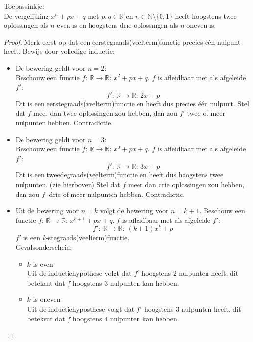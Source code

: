 \documentclass[main.tex]{subfiles}
\begin{document}
\begin{st}
  Toepassinkje:\\
  De vergelijking $x^{n} +px + q$ met $p,q \in \mathbb{R}$ en $n\in \mathbb{N} \setminus \{0,1\}$ heeft hoogstens twee oplossingen als $n$ even is en hoogstens drie oplossingen als $n$ oneven is.

  \begin{proof}
    Merk eerst op dat een eerstegraads(veelterm)functie precies \'e\'en nulpunt heeft.
    Bewijs door volledige inductie:
    \begin{itemize}
    \item De bewering geldt voor $n=2$:\\
      Beschouw een functie $f:\ \mathbb{R} \rightarrow \mathbb{R}:\ x^{2}+px+q$.
      $f$ is afleidbaar met als afgeleide $f'$:
      \[ f':\ \mathbb{R} \rightarrow \mathbb{R}:\ 2x + p \]
      Dit is een eerstegraads(veelterm)functie en heeft dus precies \'e\'en nulpunt.
      Stel dat $f$ meer dan twee oplossingen zou hebben, dan zou $f'$ twee of meer nulpunten hebben.
      Contradictie.
    \item De bewering geldt voor $n=3$:\\
      Beschouw een functie $f:\ \mathbb{R} \rightarrow \mathbb{R}:\ x^{3}+px+q$.
      $f$ is afleidbaar met als afgeleide $f'$:
      \[ f':\ \mathbb{R} \rightarrow \mathbb{R}:\ 3x+p \]
      Dit is een tweedegraads(veelterm)functie en heeft dus hoogstens twee nulpunten. (zie hierboven)
      Stel dat $f$ meer dan drie oplossingen zou hebben, dan zou $f'$ drie of meer nulpunten hebben.
      Contradictie.
    \item Uit de bewering voor $n=k$ volgt de bewering voor $n=k+1$.
      Beschouw een functie $f:\ \mathbb{R} \rightarrow \mathbb{R}:\ x^{k+1}+px+q$.
      $f$ is afleidbaar met als afgeleide $f'$:
      \[ f':\ \mathbb{R} \rightarrow \mathbb{R}:\ (k+1)x^{k}+p \]
      $f'$ is een $k$-stegraads(veelterm)functie.\\
      Gevalsonderscheid:
      \begin{itemize}
      \item $k$ is even\\
        Uit de inductiehypothese volgt dat $f'$ hoogstens $2$ nulpunten heeft, dit betekent dat $f$ hoogstens $3$ nulpunten kan hebben.
      \item $k$ is oneven\\
        Uit de inductiehyposthese volgt dat $f'$ hoogstens $3$ nulpunten heeft, dit betekent dat $f$ hoogstens $4$ nulpunten kan hebben.
      \end{itemize}
    \end{itemize}
  \end{proof}
\end{st}
\end{document}
